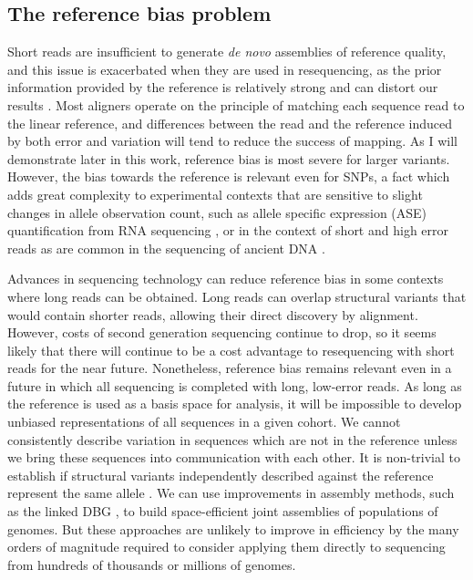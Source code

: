 \documentclass[a4paper,12pt,numbered,oneside]{Classes/PhDThesisPSnPDF}
\begin{document}
\subsection{The reference bias problem}

Short reads are insufficient to generate \emph{de novo} assemblies of reference quality, and this issue is exacerbated when they are used in resequencing, as the prior information provided by the reference is relatively strong and can distort our results \cite{sudmant2015integrated}.
Most aligners operate on the principle of matching each sequence read to the linear reference, and differences between the read and the reference induced by both error and variation will tend to reduce the success of mapping.
As I will demonstrate later in this work, reference bias is most severe for larger variants.
However, the bias towards the reference is relevant even for SNPs, a fact which adds great complexity to experimental contexts that are sensitive to slight changes in allele observation count, such as allele specific expression (ASE) quantification from RNA sequencing \cite{stevenson2013sources}, or in the context of short and high error reads as are common in the sequencing of ancient DNA \cite{zhou2017antcaller}.

Advances in sequencing technology can reduce reference bias in some contexts where long reads can be obtained.
Long reads can overlap structural variants that would contain shorter reads, allowing their direct discovery by alignment.
However, costs of second generation sequencing continue to drop, so it seems likely that there will continue to be a cost advantage to resequencing with short reads for the near future.
Nonetheless, reference bias remains relevant even in a future in which all sequencing is completed with long, low-error reads.
As long as the reference is used as a basis space for analysis, it will be impossible to develop unbiased representations of all sequences in a given cohort.
We cannot consistently describe variation in sequences which are not in the reference unless we bring these sequences into communication with each other.
It is non-trivial to establish if structural variants independently described against the reference represent the same allele \cite{chaisson2018multi}.
We can use improvements in assembly methods, such as the linked DBG \cite{turner2018integrating}, to build space-efficient joint assemblies of populations of genomes.
But these approaches are unlikely to improve in efficiency by the many orders of magnitude required to consider applying them directly to sequencing from hundreds of thousands or millions of genomes.
\end{document}
